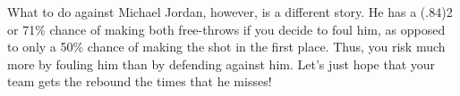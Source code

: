 What to do against Michael Jordan, however, is a different story. He has a (.84)2 or 71\% chance of making both free-throws if you decide to foul him, as opposed to only a 50\% chance of making the shot in the first place. Thus, you risk much more by fouling him than by defending against him. Let's just hope that your team gets the rebound the times that he misses! \\





























